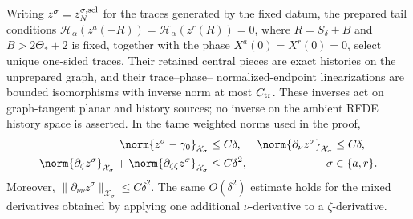 \begin{lemma}
Writing \(z^\sigma=z^{\sigma,\rm sel}_N\) for the traces generated by the
fixed datum, the prepared tail conditions
\(\mathscr H_\alpha(z^a(-R))=\mathscr H_\alpha(z^r(R))=0\), where
\(R=S_\delta+B\) and \(B>2\Theta_*+2\) is fixed, together with the phase
\(X^a(0)=X^r(0)=0\), select unique one-sided traces.  Their retained central
pieces are exact histories on the unprepared graph, and their trace--phase--
normalized-endpoint linearizations are bounded isomorphisms with inverse norm
at most \(C_{\rm tr}\).  These inverses act on graph-tangent planar and
history sources; no inverse on the ambient RFDE history space is asserted.
In the tame weighted norms used in the proof,
\begin{align}
 \norm{z^\sigma-\gamma_0}_{\mathcal X_\sigma}&\le C\delta,&
 \norm{\partial_\nu z^\sigma}_{\mathcal X_\sigma}&\le C\delta,\notag\\
 \norm{\partial_\zeta z^\sigma}_{\mathcal X_\sigma}
  +\norm{\partial_{\zeta\zeta}z^\sigma}_{\mathcal X_\sigma}&\le C\delta^2,
 &\sigma&\in\{a,r\}.                                  \label{eq:shared-trace-jets}
\end{align}
Moreover,
\(\|\partial_{\nu\nu}z^\sigma\|_{\mathcal X_\sigma}\le C\delta^2\).
The same \(O(\delta^2)\) estimate holds for the mixed derivatives obtained
by applying one additional \(\nu\)-derivative to a \(\zeta\)-derivative.
\end{lemma}

